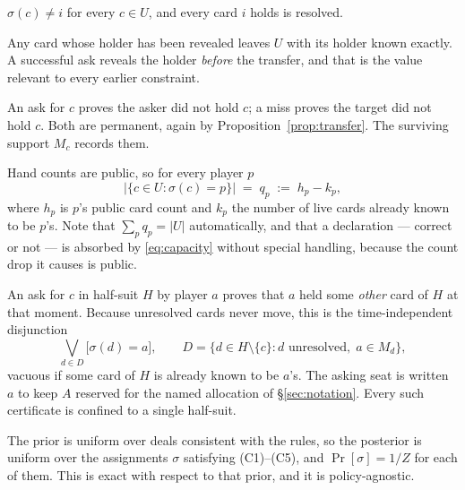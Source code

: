 \documentclass[11pt]{article}
\theoremstyle{definition}
\begin{document}
\begin{description}[style=unboxed,leftmargin=0pt,itemsep=4pt,parsep=0pt]
  \item[(C1) Own hand.] $\sigma(c) \ne i$ for every $c \in U$, and every card $i$
        holds is resolved.
  \item[(C2) Public transfers and correct declarations.] Any card whose holder
        has been revealed leaves $U$ with its holder known exactly. A successful
        ask reveals the holder \emph{before} the transfer, and that is the value
        relevant to every earlier constraint.
  \item[(C3) Exclusions.] An ask for $c$ proves the asker did not hold $c$; a
        miss proves the target did not hold $c$. Both are permanent, again by
        Proposition~\ref{prop:transfer}. The surviving support $M_c$ records
        them.
  \item[(C4) Capacities.] Hand counts are public, so for every player $p$
        \begin{equation}
          \bigl|\{c \in U : \sigma(c) = p\}\bigr| \;=\; q_p \;:=\; h_p - k_p ,
          \label{eq:capacity}
        \end{equation}
        where $h_p$ is $p$'s public card count and $k_p$ the number of live cards
        already known to be $p$'s. Note that $\sum_p q_p = |U|$ automatically,
        and that a declaration --- correct or not --- is absorbed by
        \eqref{eq:capacity} without special handling, because the count drop it
        causes is public.
  \item[(C5) Ask legality.] An ask for $c$ in half-suit $H$ by player $a$ proves
        that $a$ held some \emph{other} card of $H$ at that moment. Because
        unresolved cards never move, this is the time-independent disjunction
        \begin{equation}
          \bigvee_{d \in D} \bigl[\sigma(d) = a\bigr],
          \qquad D = \{d \in H \setminus \{c\} : d \text{ unresolved},\; a \in M_d\},
          \label{eq:disj}
        \end{equation}
        vacuous if some card of $H$ is already known to be $a$'s. The asking seat
        is written $a$ to keep $A$ reserved for the named allocation of
        \S\ref{sec:notation}. Every such certificate is confined to a single
        half-suit.
\end{description}

The prior is uniform over deals consistent with the rules, so the posterior is
uniform over the assignments $\sigma$ satisfying (C1)--(C5), and $\Pr[\sigma]
= 1/Z$ for each of them. This is exact with respect to that prior, and it is
policy-agnostic.
\end{document}

